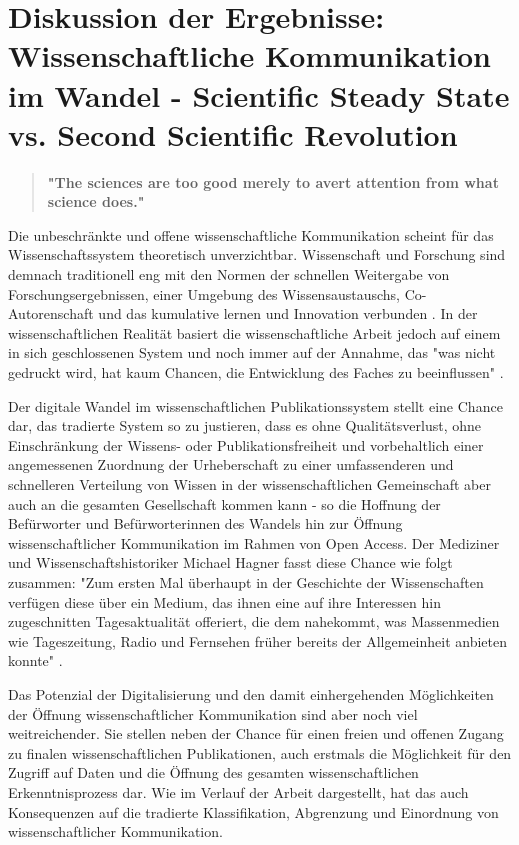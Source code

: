 \chapter{Diskussion der Ergebnisse: Wissenschaftliche Kommunikation im Wandel - Scientific Steady State vs. Second Scientific Revolution}

\begin{quote}
\textbf{"The sciences are too good merely to avert attention from what science does."}
\end{quote} \cite{kittler_2004}

Die unbeschränkte und offene wissenschaftliche Kommunikation scheint für das Wissenschaftssystem theoretisch unverzichtbar. Wissenschaft und Forschung sind demnach traditionell eng mit den Normen der schnellen Weitergabe von Forschungsergebnissen, einer Umgebung des Wissensaustauschs, Co-Autorenschaft und das kumulative lernen und Innovation verbunden \cite{Partha_1994_economics_science}. In der wissenschaftlichen Realität basiert die wissenschaftliche Arbeit jedoch auf einem in sich geschlossenen System und noch immer auf der Annahme, das "was nicht gedruckt wird, hat kaum Chancen, die Entwicklung des Faches zu beeinflussen" \cite{luhmann_1997_gesellschaft}.

Der digitale Wandel im wissenschaftlichen Publikationssystem stellt eine Chance dar, das tradierte System so zu justieren, dass es ohne Qualitätsverlust, ohne Einschränkung der Wissens- oder Publikationsfreiheit und vorbehaltlich einer angemessenen Zuordnung der Urheberschaft zu einer umfassenderen und schnelleren Verteilung von Wissen in der wissenschaftlichen Gemeinschaft aber auch an die gesamten Gesellschaft kommen kann - so die Hoffnung der Befürworter und Befürworterinnen des Wandels hin zur Öffnung wissenschaftlicher Kommunikation im Rahmen von Open Access. Der Mediziner und Wissenschaftshistoriker Michael Hagner fasst diese Chance wie folgt zusammen: "Zum ersten Mal überhaupt in der Geschichte der Wissenschaften verfügen diese über ein Medium, das ihnen eine auf ihre Interessen hin zugeschnitten Tagesaktualität offeriert, die dem nahekommt, was Massenmedien wie Tageszeitung, Radio und Fernsehen früher bereits der Allgemeinheit anbieten konnte" \cite{hagner_2015_sache_buches}.

Das Potenzial der Digitalisierung und den damit einhergehenden Möglichkeiten der Öffnung wissenschaftlicher Kommunikation sind aber noch viel weitreichender. Sie stellen neben der Chance für einen freien und offenen Zugang zu finalen wissenschaftlichen Publikationen, auch erstmals die Möglichkeit für den Zugriff auf Daten und die Öffnung des gesamten wissenschaftlichen Erkenntnisprozess dar. Wie im Verlauf der Arbeit dargestellt, hat das auch Konsequenzen auf die tradierte Klassifikation, Abgrenzung und Einordnung von wissenschaftlicher Kommunikation. 

